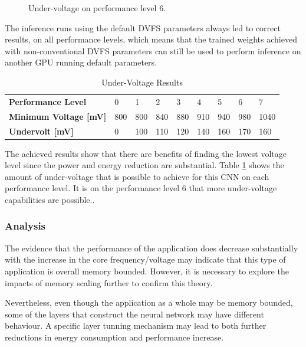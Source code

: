 \begin{figure}[!htb]
\begin{minipage}{.49\textwidth}
    \end{minipage}
    \caption{Under-voltage on performance level 6.}
    \label{fig:under6}
\end{figure}

The inference runs using the default DVFS parameters always led to correct results, on all performance levels, which means that the trained weights achieved with non-conventional DVFS parameters can still be used to perform inference on another GPU running default parameters.

\begin{table}[!htb]
\centering
\begin{tabular}{l|llllllll}
\textbf{Performance Level}  & 0   & 1   & 2   & 3   & 4   & 5   & 6   & 7    \\
\textbf{Minimum Voltage [mV]}    & 800 & 800 & 840 & 880 & 910 & 940 & 980 & 1040 \\
\textbf{Undervolt {[}mV{]}} & 0   & 100 & 110 & 120 & 140 & 160 & 170 & 160 
\end{tabular}
\caption{Under-Voltage Results}
\label{tab:undervoltage-res}
\end{table}

The achieved results show that there are benefits of finding the lowest voltage level since the power and energy reduction are substantial. Table \ref{tab:undervoltage-res} shows the amount of under-voltage that is possible to achieve for this CNN on each performance level. It is on the performance level 6 that more under-voltage capabilities are possible..



\subsubsection{Analysis}
The evidence that the performance of the application does decrease substantially with the increase in the core frequency/voltage may indicate that this type of application is overall memory bounded. However, it is necessary to explore the impacts of memory scaling further to confirm this theory. 

Nevertheless, even though the application as a whole may be memory bounded, some of the layers that construct the neural network may have different behaviour. A specific layer tunning mechanism may lead to both further reductions in energy consumption and performance increase.